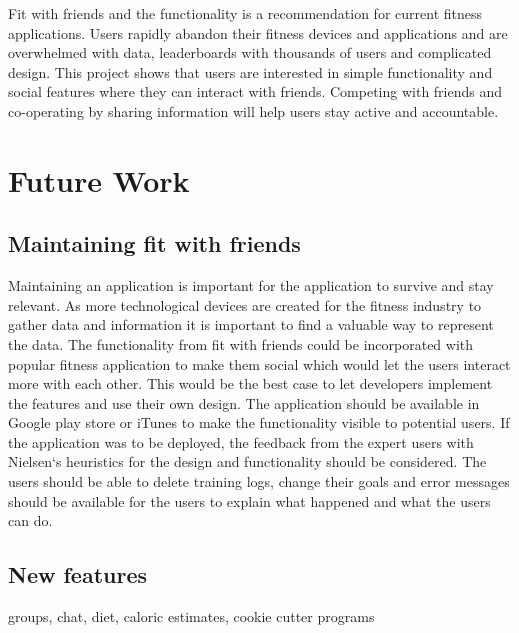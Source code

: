 Fit with friends and the functionality is a recommendation for current fitness applications. Users rapidly abandon their fitness devices and applications and are overwhelmed with data, leaderboards with thousands of users and complicated design. This project shows that users are interested in simple functionality and social features where they can interact with friends. Competing with friends and co-operating by sharing information will help users stay active and accountable.  
\section{Future Work}
\subsection{Maintaining fit with friends}
Maintaining an application is important for the application to survive and stay relevant. As more technological devices are created for the fitness industry to gather data and information it is important to find a valuable way to represent the data. The functionality from fit with friends could be incorporated with  popular fitness application to make them social which would let the users interact more with each other. This would be the best case to let developers implement the features and use their own design. The application should be available in Google play store or iTunes to make the functionality visible to potential users. If the application was to be deployed, the feedback from the expert users with Nielsen`s heuristics for the design and functionality should be considered. The users should be able to delete training logs, change their goals and error messages should be available for the users to explain what happened and what the users can do.

\subsection{New features}

groups,
chat, 
diet,
caloric estimates,
cookie cutter programs

